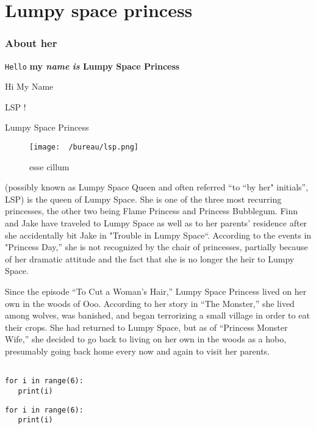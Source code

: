 \chapter{ Lumpy space princess}
\subsection{ About her}

\texttt{Hello} \textbf{my \textit{name} \textit{is} Lumpy Space Princess}
\begin{displayquote} 
   Hi
  My
  Name
 
 \end{displayquote}
\begin{displayquote} 
   LSP !
 
 \end{displayquote}
Lumpy Space Princess 
\begin{figure}
    \centering
    \texttt{[image: ~/bureau/lsp.png]}
    \caption{esse cillum}
\end{figure} (possibly known as Lumpy Space Queen and often 
referred \enquote{to ``by her" initials}, LSP) is the queen of Lumpy Space. She is one 
of the three most recurring princesses, the other two being Flame Princess 
and Princess Bubblegum. Finn and Jake have traveled to Lumpy Space as well 
as to her parents' residence after she accidentally bit Jake in "Trouble 
in Lumpy Space\enquote{. According to the events in "Princess Day,} she is not 
recognized by the chair of princesses, partially because of her dramatic 
attitude and the fact that she is no longer the heir to Lumpy Space. 

Since the episode \enquote{To Cut a Woman's Hair,} Lumpy Space Princess lived on 
her own in the woods of Ooo. According to her story in \enquote{The Monster,} she 
lived among wolves, was banished, and began terrorizing a small village in 
order to eat their crops. She had returned to Lumpy Space, but as of 
\enquote{Princess Monster Wife,} she decided to go back to living on her own in the 
woods as a hobo, presumably going back home every now and again to visit 
her parents. 


\begin{verbatim}

for i in range(6):
   print(i)

\end{verbatim}
   


\begin{listing}
   \begin{verbatim}
for i in range(6):
   print(i)

   \end{verbatim}
\end{listing}


